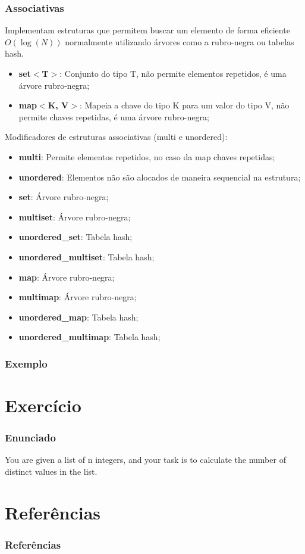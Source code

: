 \documentclass[12pt]{beamer}
\begin{document}
\begin{frame}[allowframebreaks]
    \frametitle{Associativas}

    Implementam estruturas que permitem buscar um elemento de forma eficiente $O(\log(N))$ normalmente utilizando árvores como a rubro-negra ou tabelas hash.
    \begin{itemize}
        \item\textbf{set$<$T$>$}: Conjunto do tipo T, não permite elementos repetidos, é uma árvore rubro-negra;
        \item\textbf{map$<$K, V$>$}: Mapeia a chave do tipo K para um valor do tipo V, não permite chaves repetidas, é uma árvore rubro-negra;
    \end{itemize}

    \framebreak
    Modificadores de estruturas associativas (multi e unordered):
    \begin{itemize}
        \item\textbf{multi}: Permite elementos repetidos, no caso da map chaves repetidas;
        \item\textbf{unordered}: Elementos não são alocados de maneira sequencial na estrutura;
    \end{itemize}

    \framebreak
    \begin{itemize}
        \item\textbf{set}: Árvore rubro-negra;
        \item\textbf{multiset}: Árvore rubro-negra;
        \item\textbf{unordered\_set}: Tabela hash;
        \item\textbf{unordered\_multiset}: Tabela hash;

        \item\textbf{map}: Árvore rubro-negra;
        \item\textbf{multimap}: Árvore rubro-negra;
        \item\textbf{unordered\_map}: Tabela hash;
        \item\textbf{unordered\_multimap}: Tabela hash;
    \end{itemize}

\end{frame}

\begin{frame}
    \frametitle{Exemplo}

\end{frame}

\section{Exercício}\label{Exercício}
\begin{frame}
    \frametitle{Enunciado}

    You are given a list of n integers,
    and your task is to calculate the number
    of distinct values in the list.

\end{frame}

\section{Referências}\label{Referências}
\begin{frame}[allowframebreaks]
    \frametitle{Referências}
    
\end{frame}
\end{document}
